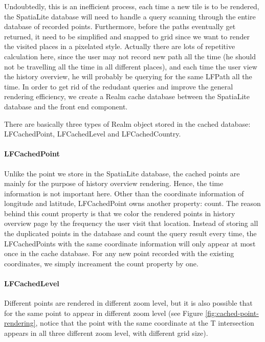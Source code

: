 \documentclass[12pt,a4paper]{article}
\renewcommand\texttt[1]{{\ttfamily\color{textttColor}#1}}
\begin{document}
                Undoubtedly, this is an inefficient process, each time a new tile is to be rendered, the SpatiaLite database will need to handle a query scanning through the entire database of recorded points. Furthermore, before the paths eventually get returned, it need to be simplified and snapped to grid since we want to render the visited places in a pixelated style. Actually there are lots of repetitive calculation here, since the user may not record new path all the time (he should not be travelling all the time in all different places), and each time the user view the history overview, he will probably be querying for the same \texttt{LFPath} all the time. In order to get rid of the redudant queries and improve the general rendering efficiency, we create a Realm cache database between the SpatiaLite database and the front end component.
                
                There are basically three types of Realm object stored in the cached database: \texttt{LFCachedPoint}, \texttt{LFCachedLevel} and \texttt{LFCachedCountry}.
            
                \paragraph{LFCachedPoint}
                    Unlike the point we store in the SpatiaLite database, the cached points are mainly for the purpose of history overview rendering. Hence, the time information is not important here. Other than the coordinate information of longitude and latitude, \texttt{LFCachedPoint} owns another property: count. The reason behind this count property is that we color the rendered points in history overview page by the frequency the user visit that location. Instead of storing all the duplicated points in the database and count the query result every time, the \texttt{LFCachedPoint}s with the same coordinate information will only appear at most once in the cache database. For any new point recorded with the existing coordinates, we simply increament the count property by one.
                    
                \paragraph{LFCachedLevel}
                    Different points are rendered in different zoom level, but it is also possible that for the same point to appear in different zoom level (see Figure \ref{fig:cached-point-rendering}, notice that the point with the same coordinate at the T intersection appears in all three different zoom level, with different grid size).
                    
\end{document}
